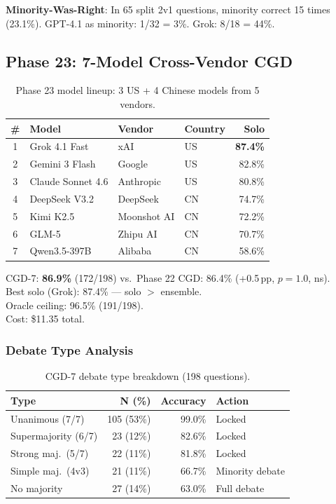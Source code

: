 \documentclass[11pt,a4paper]{article}
\newcommand{\pp}{\,pp\xspace}
\begin{document}
\textbf{Minority-Was-Right}: In 65 split 2v1 questions, minority
correct 15 times (23.1\%).  GPT-4.1 as minority: 1/32 = 3\%.
Grok: 8/18 = 44\%.

\subsection{Phase 23: 7-Model Cross-Vendor CGD}

\begin{table}[H]
\centering\small
\caption{Phase 23 model lineup: 3 US + 4 Chinese models from 5 vendors.}\label{tab:phase23models}
\begin{tabular}{@{}clllr@{}}
\toprule
\# & \textbf{Model} & \textbf{Vendor} & \textbf{Country} & \textbf{Solo} \\
\midrule
1 & Grok 4.1 Fast   & xAI         & US & \textbf{87.4\%} \\
2 & Gemini 3 Flash   & Google      & US & 82.8\% \\
3 & Claude Sonnet 4.6& Anthropic   & US & 80.8\% \\
4 & DeepSeek V3.2    & DeepSeek    & CN & 74.7\% \\
5 & Kimi K2.5        & Moonshot AI & CN & 72.2\% \\
6 & GLM-5            & Zhipu AI    & CN & 70.7\% \\
7 & Qwen3.5-397B     & Alibaba     & CN & 58.6\% \\
\bottomrule
\end{tabular}
\end{table}

\begin{resultbox}
CGD-7: \textbf{86.9\%} (172/198) vs.\ Phase 22 CGD: 86.4\%
(+0.5\pp, $p=1.0$, ns).\\
Best solo (Grok): 87.4\% --- solo $>$ ensemble.\\
Oracle ceiling: 96.5\% (191/198).\\
Cost: \$11.35 total.
\end{resultbox}

\subsubsection{Debate Type Analysis}

\begin{table}[H]
\centering\small
\caption{CGD-7 debate type breakdown (198 questions).}\label{tab:debate}
\begin{tabular}{@{}lrrl@{}}
\toprule
\textbf{Type} & \textbf{N (\%)} & \textbf{Accuracy} & \textbf{Action} \\
\midrule
Unanimous (7/7)    & 105 (53\%) & 99.0\% & Locked \\
Supermajority (6/7)& 23 (12\%)  & 82.6\% & Locked \\
Strong maj.\ (5/7) & 22 (11\%)  & 81.8\% & Locked \\
Simple maj.\ (4v3) & 21 (11\%)  & 66.7\% & Minority debate \\
No majority        & 27 (14\%)  & 63.0\% & Full debate \\
\bottomrule
\end{tabular}
\end{table}
\end{document}
